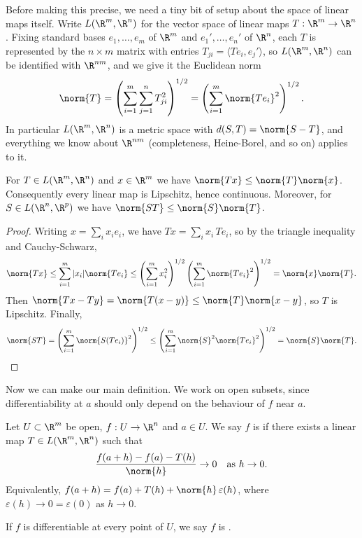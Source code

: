 Before making this precise, we need a tiny bit of setup about the space of linear maps itself. Write $L(\R^m, \R^n)$ for the vector space of linear maps $T: \R^m \rightarrow \R^n$. Fixing standard bases $e_1, \dots, e_m$ of $\R^m$ and $e_1', \dots, e_n'$ of $\R^n$, each $T$ is represented by the $n \times m$ matrix with entries $T_{ji} = \langle Te_i, e_j' \rangle$, so $L(\R^m, \R^n)$ can be identified with $\R^{nm}$, and we give it the Euclidean norm
$$
\norm{T} = \left(\sum_{i = 1}^m \sum_{j = 1}^n T_{ji}^2\right)^{1/2} = \left( \sum_{i = 1}^m \norm{Te_i}^2 \right)^{1/2}.
$$
In particular $L(\R^m, \R^n)$ is a metric space with $d(S, T) = \norm{S - T}$, and everything we know about $\R^{nm}$ (completeness, Heine-Borel, and so on) applies to it.

\begin{lemma}\label{lemma:linlip}
    For $T \in L(\R^m, \R^n)$ and $x \in \R^m$ we have $\norm{Tx} \leq \norm{T} \norm{x}$. Consequently every linear map is Lipschitz, hence continuous. Moreover, for $S \in L(\R^n, \R^p)$ we have $\norm{ST} \leq \norm{S}\norm{T}$.
\end{lemma}
\begin{proof}
    Writing $x = \sum_i x_i e_i$, we have $Tx = \sum_i x_i \, Te_i$, so by the triangle inequality and Cauchy-Schwarz,
    $$
    \norm{Tx} \leq \sum_{i = 1}^m |x_i| \norm{Te_i} \leq \left(\sum_{i = 1}^m x_i^2\right)^{1/2} \left(\sum_{i = 1}^m \norm{Te_i}^2\right)^{1/2} = \norm{x} \norm{T}.
    $$
    Then $\norm{Tx - Ty} = \norm{T(x - y)} \leq \norm{T}\norm{x - y}$, so $T$ is Lipschitz. Finally,
    $$
    \norm{ST} = \left(\sum_{i = 1}^m \norm{S(Te_i)}^2\right)^{1/2} \leq \left(\sum_{i = 1}^m \norm{S}^2\norm{Te_i}^2\right)^{1/2} = \norm{S} \norm{T}. \qedhere
    $$
\end{proof}

Now we can make our main definition. We work on open subsets, since differentiability at $a$ should only depend on the behaviour of $f$ near $a$.

\begin{definition}[Differentiability]
    Let $U \subset \R^m$ be open, $f: U \rightarrow \R^n$ and $a \in U$. We say $f$ is  if there exists a linear map $T \in L(\R^m, \R^n)$ such that
    $$
    \frac{f(a + h) - f(a) - T(h)}{\norm{h}} \rightarrow 0 \quad \text{as } h \rightarrow 0.
    $$
    Equivalently, $f(a + h) = f(a) + T(h) + \norm{h}\, \varepsilon(h)$, where $\varepsilon(h) \rightarrow 0 = \varepsilon(0)$ as $h \rightarrow 0$.

    If $f$ is differentiable at every point of $U$, we say $f$ is .
\end{definition}


